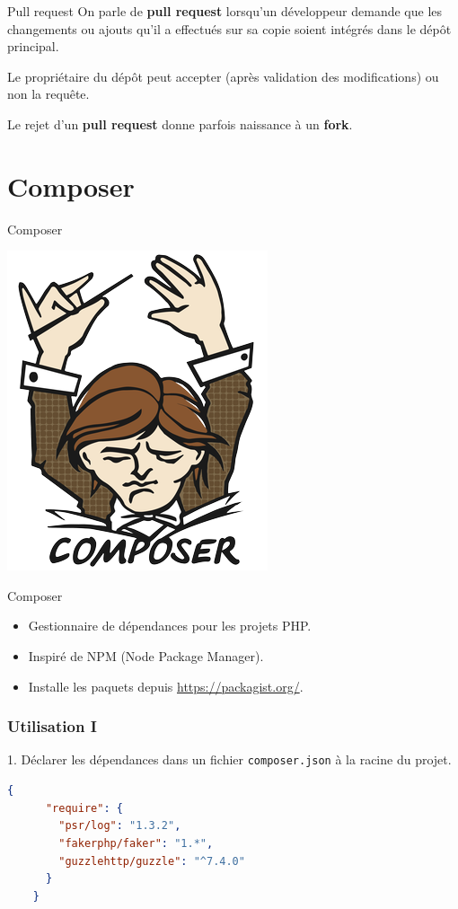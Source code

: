 \documentclass{beamer}
\begin{document}
\begin{frame}{Pull request}
  On parle de \textbf{pull request} lorsqu'un développeur demande que les changements ou ajouts qu'il a effectués sur sa copie soient intégrés dans le dépôt principal.

  Le propriétaire du dépôt peut accepter (après validation des modifications) ou non la requête.

  Le rejet d'un \textbf{pull request} donne parfois naissance à un \textbf{fork}.
\end{frame}

\section{Composer}
\begin{frame}{Composer}
\begin{center}
  \includegraphics[scale=1.5]{images/composer.png}
\end{center}
\end{frame}

\begin{frame}{Composer}
\begin{itemize}
  \item Gestionnaire de dépendances pour les projets PHP.
  \item Inspiré de NPM (Node Package Manager).
  \item Installe les paquets depuis \url{https://packagist.org/}.
\end{itemize}
\end{frame}

\begin{frame}[fragile]
\frametitle{Utilisation I}
  1. Déclarer les dépendances dans un fichier \texttt{composer.json} à la racine du projet.
  \begin{lstlisting}[language=json]
    {
      "require": {
        "psr/log": "1.3.2",
        "fakerphp/faker": "1.*",
        "guzzlehttp/guzzle": "^7.4.0"
      }
    }
  \end{lstlisting}
\end{frame}
\end{document}
